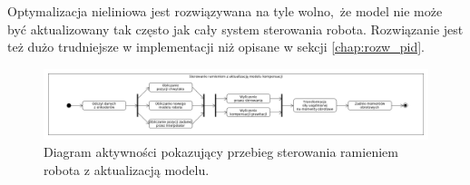 Optymalizacja nieliniowa jest rozwiązywana na tyle wolno, że model nie może być aktualizowany tak często jak cały system sterowania robota. Rozwiązanie jest też dużo trudniejsze w implementacji niż opisane w sekcji \ref{chap:rozw_pid}. 

\begin{figure}
	\centering
	\includegraphics[width=.99\textwidth]{images/komp_model.png}
	\caption{Diagram aktywności pokazujący przebieg sterowania ramieniem robota z aktualizacją modelu.}
	\label{fig:kompensacja}
\end{figure}